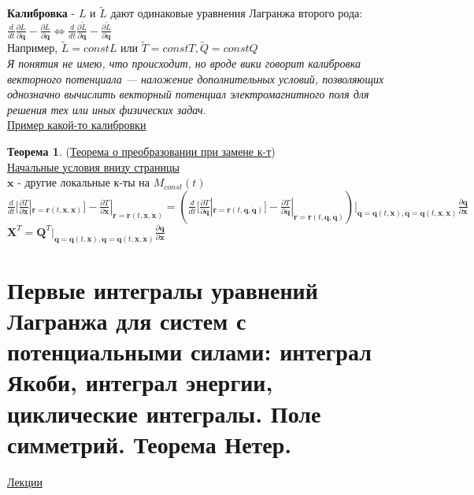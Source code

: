 \documentclass[specialist, subf, href, colorlinks=true, 12pt, times, mtpro, final]{disser}
\theoremstyle{definition}
\newtheorem{theorem}{Теорема}[section]
\def\note{\textcolor{faded}}
\def\bfr{\mathbf{r}}
\def\bfq{\mathbf{q}}
\def\bfQ{\mathbf{Q}}
\def\bfx{\mathbf{x}}
\def\bfX{\mathbf{X}}
\begin{document}
	\textbf{Калибровка} - $L$ и $\widetilde{L}$ дают одинаковые уравнения Лагранжа второго рода:\\
	$\frac{d}{dt}\frac{\partial L}{\partial \dot{\bfq}} - \frac{\partial L}{\partial \bfq} \Leftrightarrow \frac{d}{dt}\frac{\partial \widetilde{L}}{\partial \dot{\bfq}} - \frac{\partial \widetilde{L}}{\partial \bfq}$\\
	Например, $\widetilde{L} = const L$ или $\widetilde{T} = const  T, \widetilde{Q} = const Q$\\
	\note{\it Я понятия не имею, что происходит, но вроде вики говорит калибровка векторного потенциала — наложение дополнительных условий, позволяющих однозначно вычислить векторный потенциал электромагнитного поля для решения тех или иных физических задач.}\\
	
	\hyperlink {first_lects.30}{Пример какой-то калибровки} \\
	
	\begin{theorem}(\hyperlink {first_lects.31}{Теорема о преобразовании при замене к-т})\\
	
	\hyperlink {first_lects.31}{Начальные условия внизу страницы}\\
	
	$\bfx$ - другие локальные к-ты на $M_{const} (t)$\\
	$\frac{d}{dt}[\frac{\partial T}{\partial \dot{\bfx}}|_{\dot{\bfr} = \dot{\bfr}(t, \bfx, \dot{\bfx})}]  -  \frac{\partial T}{\partial \bfx}|_{\dot{\bfr} = \dot{\bfr}(t, \bfx, \dot{\bfx})} = 
	(\frac{d}{dt}[\frac{\partial T}{\partial \dot{\bfq}}|_{\dot{\bfr} = \dot{\bfr}(t, \bfq, \dot{\bfq})}]  -  \frac{\partial T}{\partial \bfq}|_{\dot{\bfr} = \dot{\bfr}(t, \bfq, \dot{\bfq})})|_{\bfq = \bfq(t, \bfx), \dot{\bfq} = \dot{\bfq} (t, \bfx, \dot{\bfx})} \frac{\partial \bfq}{\partial \bfx}$\\
	$\bfX^T =  \bfQ^T |_{\bfq = \bfq(t, \bfx), \dot{\bfq} = \dot{\bfq} (t, \bfx, \dot{\bfx})} \frac{\partial \bfq}{\partial \bfx}$ 
	\end{theorem}
	
	
     
    
    \section{Первые интегралы уравнений Лагранжа для систем с потенциальными силами:    интеграл Якоби, интеграл энергии, циклические интегралы. Поле симметрий. Теорема Нетер.}
     \label{8}
    \hyperlink {lects.1}{Лекции} \\
    
\end{document}
